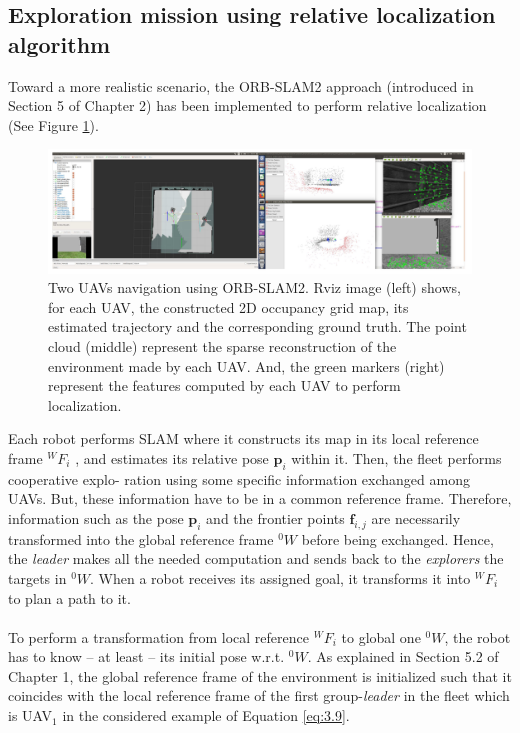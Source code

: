 \documentclass[11pt,openany]{book}
\begin{document}
\subsection{Exploration mission using relative localization algorithm}
Toward a more realistic scenario, the ORB-SLAM2 approach (introduced in Section 5 of Chapter 2) has been implemented to perform relative localization (See Figure \ref{fig:3.23}).
\begin{figure}[H]
    \centering
    \includegraphics[scale=0.3]{assets/3_23.png}
    \caption{Two UAVs navigation using ORB-SLAM2. Rviz image (left) shows, for each UAV, the constructed 2D occupancy grid map, its estimated trajectory and the corresponding ground truth. The point cloud (middle) represent the sparse reconstruction of the environment made by each UAV. And, the green markers (right) represent the features computed by each UAV to perform localization.}
    \label{fig:3.23}
\end{figure}
Each robot performs SLAM where it constructs its map in its local reference frame $^WF_i$ , and estimates its relative pose $\mathbf{p}_i$ within it. Then, the ﬂeet performs cooperative explo- ration using some speciﬁc information exchanged among UAVs. But, these information have to be in a common reference frame. Therefore, information such as the pose $\mathbf{p}_i$ and the frontier points $\mathbf{f}_{i,j}$ are necessarily transformed into the global reference frame $^0W$ before being exchanged. Hence, the \textit{leader} makes all the needed computation and sends back to the \textit{explorers} the targets in $^0W$. When a robot receives its assigned goal, it transforms it into $^WF_i$ to plan a path to it.\\\\
To perform a transformation from local reference $^WF_i$ to global one $^0W$, the robot has to know – at least – its initial pose w.r.t. $^0W$. As explained in Section 5.2 of Chapter 1, the global reference frame of the environment is initialized such that it coincides with the local reference frame of the ﬁrst group-\textit{leader} in the ﬂeet which is UAV$_1$ in the considered example of Equation \ref{eq:3.9}.
\end{document}
